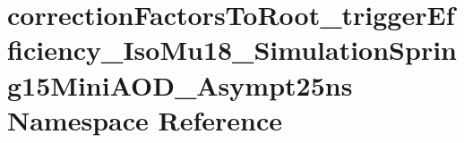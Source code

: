 \hypertarget{namespacecorrectionFactorsToRoot__triggerEfficiency__IsoMu18__SimulationSpring15MiniAOD__Asympt25ns}{
\section{correctionFactorsToRoot\_\-triggerEfficiency\_\-IsoMu18\_\-SimulationSpring15MiniAOD\_\-Asympt25ns Namespace Reference}
\label{namespacecorrectionFactorsToRoot__triggerEfficiency__IsoMu18__SimulationSpring15MiniAOD__Asympt25ns}
}
